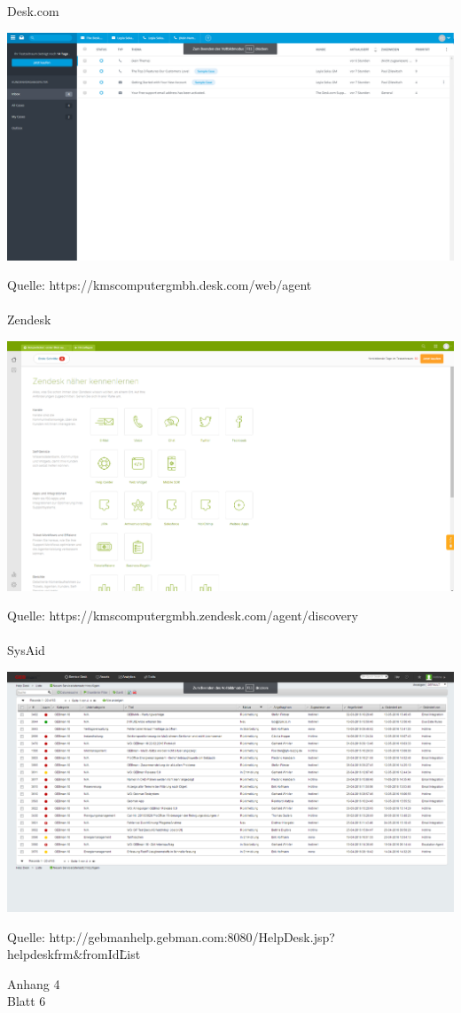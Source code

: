 \noindent Desk.com
\begin{flushleft}
\includegraphics[width=1.0\textwidth]{Abbildungen/Deskcom.png}
\end{flushleft}
\noindent Quelle: https://kmscomputergmbh.desk.com/web/agent \\\\

\noindent Zendesk
\begin{flushleft}
\includegraphics[width=1.0\textwidth]{Abbildungen/Zendesk.png}
\end{flushleft}
\noindent Quelle: https://kmscomputergmbh.zendesk.com/agent/discovery\\\\

\noindent SysAid
\begin{flushleft}
\includegraphics[width=1.0\textwidth]{Abbildungen/SysAid.png}
\end{flushleft}
\noindent Quelle: http://gebmanhelp.gebman.com:8080/HelpDesk.jsp?helpdeskfrm\&fromId\=List
\newpage

\begin{flushright}
Anhang 4\\
Blatt 6\\
\end{flushright}





